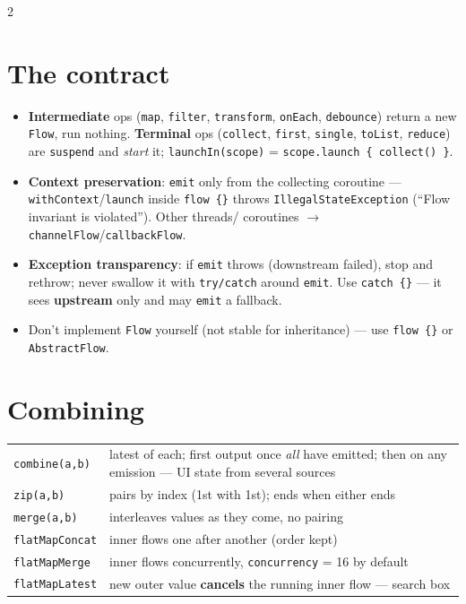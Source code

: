 \documentclass[8pt]{extarticle}
\begin{document}
\begin{multicols}{2}
\raggedright

\section{The contract}
\begin{itemize}\raggedright
  \item \textbf{Intermediate} ops (\texttt{map}, \texttt{filter}, \texttt{transform},
        \texttt{onEach}, \texttt{debounce}) return a new \texttt{Flow}, run nothing.
        \textbf{Terminal} ops (\texttt{collect}, \texttt{first}, \texttt{single},
        \texttt{toList}, \texttt{reduce}) are \texttt{suspend} and \emph{start} it;
        \texttt{launchIn(scope)} = \texttt{scope.launch \{ collect() \}}.
  \item \textbf{Context preservation}: \texttt{emit} only from the collecting coroutine —
        \texttt{withContext}/\texttt{launch} inside \texttt{flow \{\}} throws
        \texttt{IllegalStateException} (``Flow invariant is violated''). Other threads/
        coroutines $\to$ \texttt{channelFlow}/\texttt{callbackFlow}.
  \item \textbf{Exception transparency}: if \texttt{emit} throws (downstream failed), stop
        and rethrow; never swallow it with \texttt{try/catch} around \texttt{emit}. Use
        \texttt{catch \{\}} — it sees \textbf{upstream} only and may \texttt{emit} a fallback.
  \item Don't implement \texttt{Flow} yourself (not stable for inheritance) — use
        \texttt{flow \{\}} or \texttt{AbstractFlow}.
\end{itemize}

\section{Combining}
{\scriptsize
\noindent\begin{tabularx}{\linewidth}{@{}>{\raggedright\arraybackslash}p{19mm}X@{}}
\toprule
\texttt{combine(a,b)} & latest of each; first output once \emph{all} have emitted; then on any
  emission — UI state from several sources \\
\texttt{zip(a,b)} & pairs by index (1st with 1st); ends when either ends \\
\texttt{merge(a,b)} & interleaves values as they come, no pairing \\
\texttt{flatMapConcat} & inner flows one after another (order kept) \\
\texttt{flatMapMerge} & inner flows concurrently, \texttt{concurrency} = 16 by default \\
\texttt{flatMapLatest} & new outer value \textbf{cancels} the running inner flow — search box \\
\bottomrule
\end{tabularx}}


\end{multicols}
\end{document}
